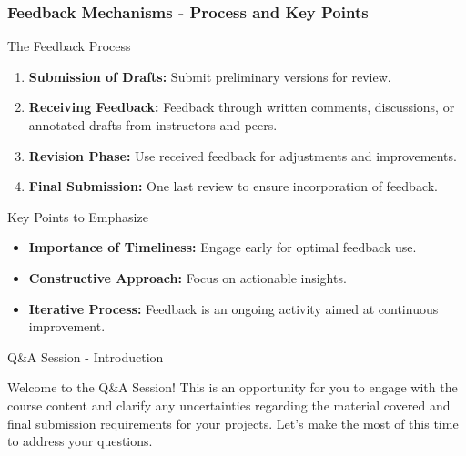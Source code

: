 \documentclass[aspectratio=169]{beamer}
\begin{document}
\begin{frame}[fragile]
    \frametitle{Feedback Mechanisms - Process and Key Points}
    \begin{block}{The Feedback Process}
        \begin{enumerate}
            \item \textbf{Submission of Drafts:} Submit preliminary versions for review.
            \item \textbf{Receiving Feedback:} Feedback through written comments, discussions, or annotated drafts from instructors and peers.
            \item \textbf{Revision Phase:} Use received feedback for adjustments and improvements.
            \item \textbf{Final Submission:} One last review to ensure incorporation of feedback.
        \end{enumerate}
    \end{block}

    \begin{block}{Key Points to Emphasize}
        \begin{itemize}
            \item \textbf{Importance of Timeliness:} Engage early for optimal feedback use.
            \item \textbf{Constructive Approach:} Focus on actionable insights.
            \item \textbf{Iterative Process:} Feedback is an ongoing activity aimed at continuous improvement.
        \end{itemize}
    \end{block}
\end{frame}

\begin{frame}[fragile]{Q\&A Session - Introduction}
  \begin{block}{Welcome to the Q\&A Session!}
    This is an opportunity for you to engage with the course content and clarify any uncertainties regarding the material covered and final submission requirements for your projects. Let’s make the most of this time to address your questions.
  \end{block}
\end{frame}
\end{document}
